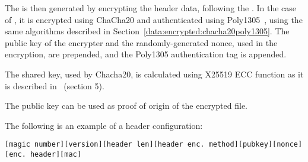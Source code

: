 The  is then generated by encrypting the header data, following the .
%
In the case of , it is encrypted using ChaCha20 and authenticated using Poly1305~\cite{RFC8439}, using the same algorithms described in Section~\ref{data:encrypted:chacha20poly1305}.
%
The public key of the encrypter and the randomly-generated nonce, used in the encryption, are prepended, and the Poly1305 authentication tag is appended.


The shared key, used by Chacha20, is calculated using X25519 ECC function as it is described in~\cite{RFC7748} (section 5).
%

The public key can be used as proof of origin of the encrypted file.
%


The following is an example of a header configuration:
%
\begin{verbatim}
[magic number][version][header len][header enc. method][pubkey][nonce][enc. header][mac]
\end{verbatim}
